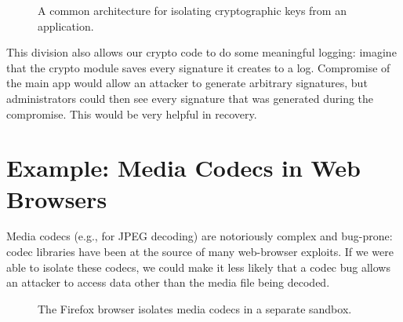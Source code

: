 \documentclass[
  letterpaper,
]{scrbook}
\theoremstyle{definition}
\theoremstyle{plain}
\theoremstyle{plain}
\theoremstyle{remark}
\begin{document}

\begin{figure}


\caption{\label{fig-key-manager}A common architecture for isolating
cryptographic keys from an application.}

\end{figure}%

This division also allows our crypto code to do some meaningful logging:
imagine that the crypto module saves every signature it creates to a
log. Compromise of the main app would allow an attacker to generate
arbitrary signatures, but administrators could then see every signature
that was generated during the compromise. This would be very helpful in
recovery.

\section{Example: Media Codecs in Web Browsers}\label{sec-split-codec}

Media codecs (e.g., for JPEG decoding) are notoriously complex and
bug-prone: codec libraries have been at the source of many web-browser
exploits. If we were able to isolate these codecs, we could make it less
likely that a codec bug allows an attacker to access data other than the
media file being decoded.

\begin{figure}


\caption{\label{fig-codec}The Firefox browser isolates media codecs in a
separate sandbox.}

\end{figure}%
\end{document}
